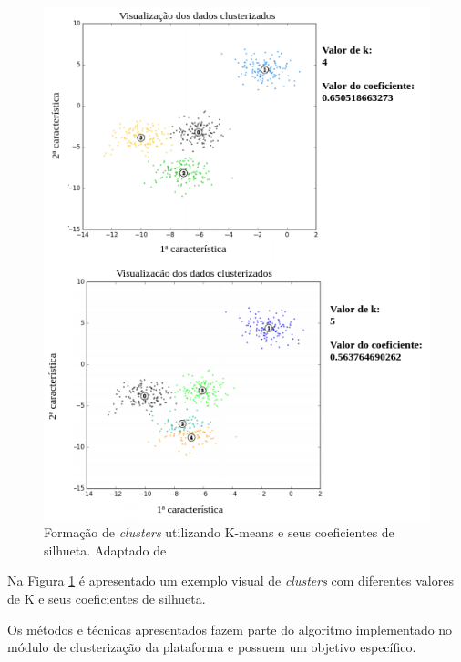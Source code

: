 \begin{figure}[bt!]
\centering
\includegraphics[scale=1]{figuras/exemplo_silhueta.png}
\caption{Formação de \textit{clusters} utilizando K-means e seus coeficientes de silhueta. Adaptado de }
\label{fig:exemplo_silhueta}
\end{figure}

\vfill
\pagebreak
Na Figura \ref{fig:exemplo_silhueta} é apresentado um exemplo visual de \textit{clusters} com diferentes valores
de K e seus coeficientes de silhueta.

Os métodos e técnicas apresentados fazem parte do algoritmo implementado no módulo de clusterização da plataforma 
e possuem um objetivo específico. 

